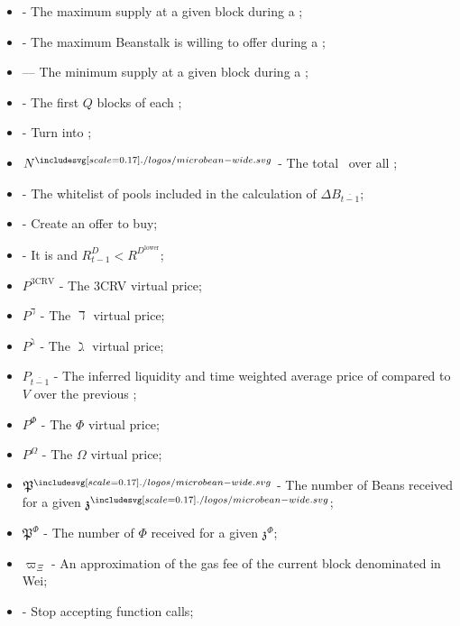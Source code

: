 \documentclass[class=article, crop=false]{standalone}
\begin{document}
\begin{itemize}[topsep=0pt, itemsep=3pt,leftmargin=16pt]
    \item[]  - The maximum  supply at a given block during a ;
    \item[]  - The maximum  Beanstalk is willing to offer during a ;
    \item[]  — The minimum  supply at a given block during a ;
    \item[]  - The first $Q$ blocks of each ;
    \item[]  - \hypertarget{ht131}{Turn  into };
    \item[] $N^{\bean}$ - \hypertarget{ht132}{The total  \Bean\ over all };
    \item[]  - \hypertarget{ht133}{The whitelist of pools included in the calculation of $\Delta B_{\overline{t-1}}$};
    \item[]  - \hypertarget{ht134}{Create an offer to buy};
    \item[]  - \hypertarget{ht135}{It is  and $R^D_{t-1} < R^{D^{\text{lower}}}$};
    \item[] $P^{\text{3CRV}}$ - \hypertarget{ht136}{The 3CRV virtual price};
    \item[] $P^{\daleth}$ - \hypertarget{ht137}{The $\daleth$ virtual price};
    \item[] $P^{\gimel}$ - \hypertarget{ht138}{The $\gimel$ virtual price};
    \item[] $P_{\overline{t-1}}$ - \hypertarget{ht139}{The inferred liquidity and time weighted average price of  compared to $V$ over the previous };
    \item[] $P^{\Phi}$ - \hypertarget{ht140}{The $\Phi$ virtual price};
    \item[] $P^{\Omega}$ - \hypertarget{ht141}{The $\Omega$ virtual price};
    \item[] $\mathfrak{P}^{\bean}$ - \hypertarget{ht142}{The number of Beans received for  a given $\mathfrak{z}^{\bean}$};
    \item[] $\mathfrak{P}^{\Phi}$ - \hypertarget{ht143}{The number of $\Phi$ received for  a given $\mathfrak{z}^{\Phi}$};
    \item[] $\varpi_\Xi$ - An approximation of the gas fee of the current block denominated in Wei;
    \item[]  - \hypertarget{ht144}{Stop accepting  function calls};

\end{itemize}
\end{document}
